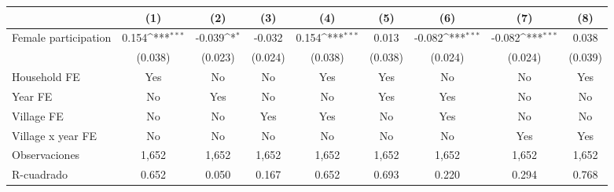 {
\def\sym#1{\ifmmode^{#1}\else\(^{#1}\)\fi}
\begin{tabular}{l*{8}{c}}
\toprule
                    &\multicolumn{1}{c}{(1)}         &\multicolumn{1}{c}{(2)}         &\multicolumn{1}{c}{(3)}         &\multicolumn{1}{c}{(4)}         &\multicolumn{1}{c}{(5)}         &\multicolumn{1}{c}{(6)}         &\multicolumn{1}{c}{(7)}         &\multicolumn{1}{c}{(8)}         \\
\midrule
Female participation&       0.154\sym{***}&      -0.039\sym{*}  &      -0.032         &       0.154\sym{***}&       0.013         &      -0.082\sym{***}&      -0.082\sym{***}&       0.038         \\
                    &     (0.038)         &     (0.023)         &     (0.024)         &     (0.038)         &     (0.038)         &     (0.024)         &     (0.024)         &     (0.039)         \\
\midrule
Household FE        &         Yes         &          No         &          No         &         Yes         &         Yes         &          No         &          No         &         Yes         \\
Year FE             &          No         &         Yes         &          No         &          No         &         Yes         &         Yes         &          No         &          No         \\
Village FE          &          No         &          No         &         Yes         &         Yes         &          No         &         Yes         &          No         &          No         \\
Village x year FE   &          No         &          No         &          No         &          No         &          No         &          No         &         Yes         &         Yes         \\
Observaciones       &       1,652         &       1,652         &       1,652         &       1,652         &       1,652         &       1,652         &       1,652         &       1,652         \\
R-cuadrado          &       0.652         &       0.050         &       0.167         &       0.652         &       0.693         &       0.220         &       0.294         &       0.768         \\
\bottomrule
\end{tabular}
}
